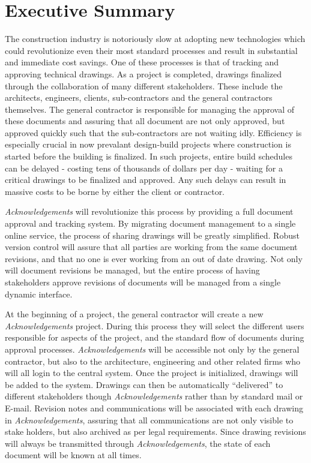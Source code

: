 \section{Executive Summary}

The construction industry is notoriously slow at adopting new technologies which could revolutionize even their most standard processes and result in substantial and immediate cost savings. One of these processes is that of tracking and approving technical drawings. As a project is completed, drawings finalized through the collaboration of many different stakeholders. These include the architects, engineers, clients, sub-contractors and the general contractors themselves. The general contractor is responsible for managing the approval of these documents and assuring that all document are not only approved, but approved quickly such that the sub-contractors are not waiting idly. Efficiency is especially crucial in now prevalant design-build projects where construction is started before the building is finalized. In such projects, entire build schedules can be delayed - costing tens of thousands of dollars per day - waiting for a critical drawings to be finalized and approved. Any such delays can result in massive costs to be borne by either the client or contractor.

{\it Acknowledgements} will revolutionize this process by providing a full document approval and tracking system. By migrating document management to a single online service, the process of sharing drawings will be greatly simplified. Robust version control will assure that all parties are working from the same document revisions, and that no one is ever working from an out of date drawing. Not only will document revisions be managed, but the entire process of having stakeholders approve revisions of documents will be managed from a single dynamic interface.

At the beginning of a project, the general contractor will create a new {\it Acknowledgements} project. During this process they will select the different users responsible for aspects of the project, and the standard flow of documents during approval processes. {\it Acknowledgements} will be accessible not only by the general contractor, but also to the architecture, engineering and other related firms who will all login to the central system. Once the project is initialized, drawings will be added to the system. Drawings can then be automatically ``delivered'' to different stakeholders though {\it Acknowledgements} rather than by standard mail or E-mail. Revision notes and communications will be associated with each drawing in {\it Acknowledgements}, assuring that all communications are not only visible to stake holders, but also archived as per legal requirements. Since drawing revisions will always be transmitted through {\it Acknowledgements}, the state of each document will be known at all times. 

